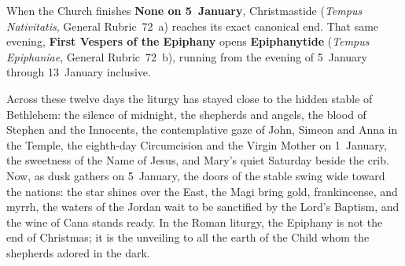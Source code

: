 When the Church finishes \textbf{None on 5~January}, Christmastide
(\textit{Tempus Nativitatis}, General Rubric~72~a) reaches its exact canonical
end. That same evening, \textbf{First Vespers of the Epiphany} opens
\textbf{Epiphanytide} (\textit{Tempus Epiphaniae}, General Rubric~72~b),
running from the evening of 5~January through 13~January inclusive.

Across these twelve days the liturgy has stayed close to the hidden stable of
Bethlehem: the silence of midnight, the shepherds and angels, the blood of
Stephen and the Innocents, the contemplative gaze of John, Simeon and Anna in
the Temple, the eighth-day Circumcision and the Virgin Mother on 1~January, the
sweetness of the Name of Jesus, and Mary's quiet Saturday beside the crib. Now,
as dusk gathers on 5~January, the doors of the stable swing wide toward the
nations: the star shines over the East, the Magi bring gold, frankincense, and
myrrh, the waters of the Jordan wait to be sanctified by the Lord's Baptism,
and the wine of Cana stands ready. In the Roman liturgy, the Epiphany is not
the end of Christmas; it is the unveiling to all the earth of the Child whom
the shepherds adored in the dark.
